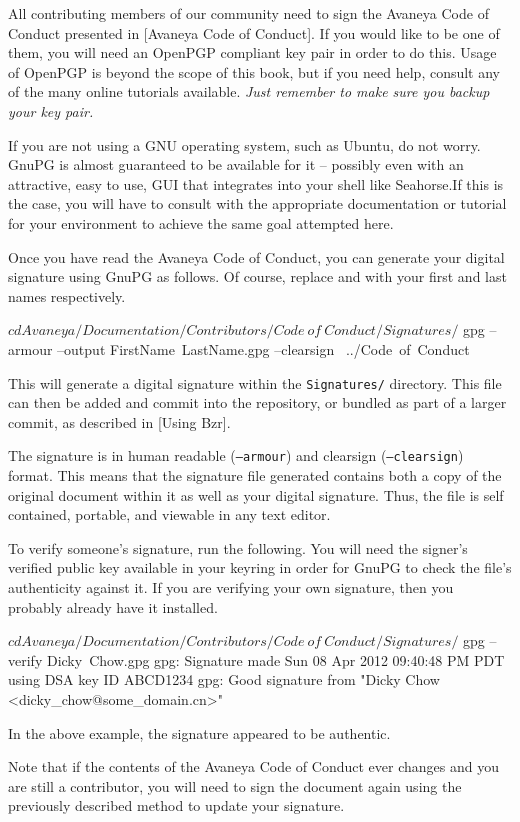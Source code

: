 

All contributing members of our community need to sign the Avaneya Code of Conduct presented in [Avaneya Code of Conduct]. If you would like to be one of them, you will need an OpenPGP compliant key pair in order to do this. Usage of OpenPGP is beyond the scope of this book, but if you need help, consult any of the many online tutorials available. {\it Just remember to make sure you backup your key pair.}

If you are not using a GNU operating system, such as Ubuntu, do not worry. GnuPG is almost guaranteed to be available for it -- possibly even with an attractive, easy to use, GUI that integrates into your shell like Seahorse.\footnotecite[seahorse] If this is the case, you will have to consult with the appropriate documentation or tutorial for your environment to achieve the same goal attempted here.

Once you have read the Avaneya Code of Conduct, you can generate your digital signature using GnuPG as follows. Of course, replace  and  with your first and last names respectively.

\startCodeExample
$ cd Avaneya/Documentation/Contributors/Code\ of\ Conduct/Signatures/
$ gpg --armour --output FirstName\ LastName.gpg --clearsign \
    ../Code\ of\ Conduct
\stopCodeExample

This will generate a digital signature within the {\tt Signatures/} directory. This file can then be added and commit into the repository, or bundled as part of a larger commit, as described in [Using Bzr]. 

The signature is in human readable ({\tt --armour}) and clearsign ({\tt --clearsign}) format. This means that the signature file generated contains both a copy of the original document within it as well as your digital signature. Thus, the file is self contained, portable, and viewable in any text editor.

To verify someone's signature, run the following. You will need the signer's verified public key available in your keyring in order for GnuPG to check the file's authenticity against it. If you are verifying your own signature, then you probably already have it installed.

\startCodeExample
$ cd Avaneya/Documentation/Contributors/Code\ of\ Conduct/Signatures/
$ gpg --verify Dicky\ Chow.gpg 
gpg: Signature made Sun 08 Apr 2012 09:40:48 PM PDT using DSA key ID ABCD1234
gpg: Good signature from "Dicky Chow <dicky_chow@some_domain.cn>"
\stopCodeExample

In the above example, the signature appeared to be authentic.

Note that if the contents of the Avaneya Code of Conduct ever changes and you are still a contributor, you will need to sign the document again using the previously described method to update your signature.

